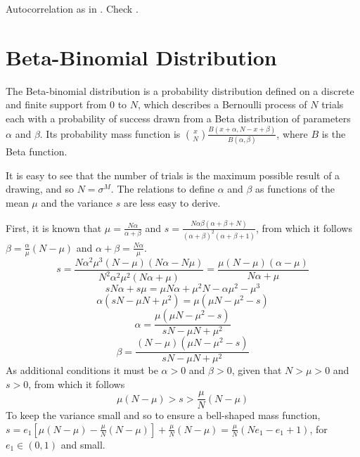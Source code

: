\documentclass[a4paper, headings=standardclasses]{scrartcl}
\numberwithin{equation}{subsection}
\begin{document}
Autocorrelation as in \parencite{assenza2015}.
Check \Parencite[p.72]{dosi2017a}.


\clearpage

\printbibliography

\clearpage

\appendix

\section{Beta-Binomial Distribution}
\label{sec:beta-binomial}
The Beta-binomial distribution is a probability distribution defined on a discrete and finite support from $0$ to $N$, which describes a Bernoulli process of $N$ trials each with a probability of success drawn from a Beta distribution of parameters $\alpha$ and $\beta$.
Its probability mass function is $\binom{x}{N}\frac{B(x+\alpha, N-x+\beta)}{B(\alpha,\beta)}$, where $B$ is the Beta function.

It is easy to see that the number of trials is the maximum possible result of a drawing, and so $N=\sigma^M$.
The relations to define $\alpha$ and $\beta$ as functions of the mean $\mu$ and the variance $s$ are less easy to derive.

First, it is known that $\mu = \frac{N \alpha}{\alpha + \beta}$  and $s=\frac{N\alpha\beta(\alpha + \beta + N)}{(\alpha+\beta)^2(\alpha+\beta+1)}$, from which it follows $\beta = \frac{\alpha}{\mu}(N-\mu)$ and $\alpha + \beta = \frac{N \alpha}{\mu}$.
$$s=\frac{N\alpha^2\mu^3(N-\mu)(N\alpha-N\mu)}{N^2\alpha^2\mu^2(N\alpha+\mu)} = \frac{\mu(N-\mu)(\alpha-\mu)}{N\alpha+\mu}$$
$$sN\alpha + s\mu = \mu N\alpha + \mu^2 N - \alpha \mu^2 - \mu^3$$
$$\alpha(sN -\mu N + \mu^2) = \mu(\mu N - \mu^2 -s)$$
$$\alpha=\frac{\mu(\mu N - \mu^2 -s)}{sN -\mu N + \mu^2}$$
$$\beta=\frac{(N-\mu)(\mu N - \mu^2 -s)}{sN -\mu N + \mu^2}$$
As additional conditions it must be $\alpha > 0$ and $\beta>0$, given that $N>\mu>0$ and $s>0$, from which it follows
$$\mu(N-\mu) > s > \frac{\mu}{N}(N-\mu)$$
To keep the variance small and so to ensure a bell-shaped mass function, $s=e_1[\mu(N-\mu)-\frac{\mu}{N}(N-\mu)] + \frac{\mu}{N}(N-\mu) = \frac{\mu}{N}(Ne_1-e_1+1)$, for $e_1 \in (0,1)$ and small.
\end{document}

